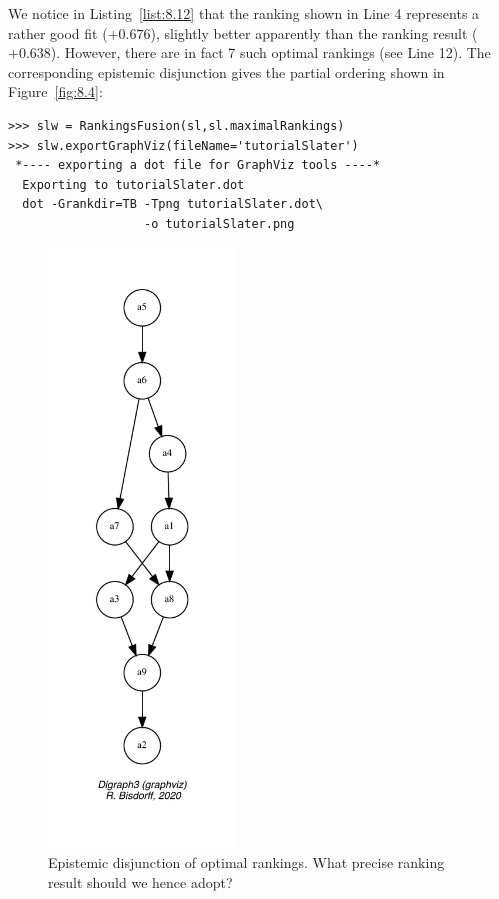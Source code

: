 We notice in Listing~\vref{list:8.12} that the \Slater ranking shown in Line 4 represents a rather good fit ($+0.676$), slightly better apparently than the \NetFlows ranking result ($+0.638$). However, there are in fact 7 such optimal \Slater rankings (see Line 12). The corresponding epistemic disjunction gives the partial ordering shown in Figure~\vref{fig:8.4}:
\begin{lstlisting}[caption={Computing the epistemic disjunction of optimal \Slater rankings},label=list:8.13]   
>>> slw = RankingsFusion(sl,sl.maximalRankings)
>>> slw.exportGraphViz(fileName='tutorialSlater')
 *---- exporting a dot file for GraphViz tools ----*
  Exporting to tutorialSlater.dot
  dot -Grankdir=TB -Tpng tutorialSlater.dot\
                   -o tutorialSlater.png
\end{lstlisting}
\begin{figure}[ht]
\sidecaption[t]
\includegraphics[width=5cm]{Figures/8-4-tutorialSlater.pdf}
\caption{Epistemic disjunction of optimal \Slater rankings. What precise \Slater ranking result should we hence adopt?}
\label{fig:8.4}       %
\end{figure}
       

